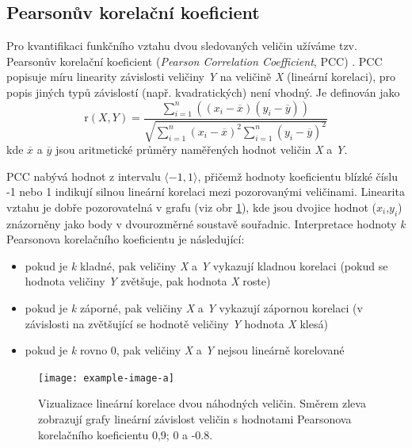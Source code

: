 \subsection{Pearsonův korelační koeficient}
Pro kvantifikaci funkčního vztahu dvou sledovaných veličin užíváme tzv. Pearsonův korelační koeficient (\textit{Pearson Correlation Coefficient}, PCC) \cite{PCC}. PCC popisuje míru linearity závislosti veličiny \textit{Y} na veličině \textit{X} (lineární korelaci), pro popis jiných typů závislostí (např. kvadratických) není vhodný. Je definován jako
\begin{equation}
\label{pearson}
    \text{r}(X,Y) = \frac
    {\sum_{i=1}^n ((x_i - \overline{x})(y_i - \overline{y}))}
    {\sqrt{\sum_{i=1}^n (x_i - \overline{x})^2 \sum_{i=1}^n (y_i - \overline{y})^2}}
\end{equation}
kde $\overline{x}$ a $\overline{y}$ jsou aritmetické průměry naměřených hodnot veličin \textit{X} a \textit{Y}. 

PCC nabývá hodnot z intervalu $\langle-1, 1 \rangle$, přičemž hodnoty koeficientu blízké číslu -1 nebo 1 indikují silnou lineární korelaci mezi pozorovanými veličinami. Linearita vztahu je dobře pozorovatelná v grafu (viz obr \ref{PCC_obr}), kde jsou dvojice hodnot ($x_i$,$y_i$) znázorněny jako body v dvourozměrné soustavě souřadnic. Interpretace hodnoty \textit{k} Pearsonova korelačního koeficientu je následující: 
\begin{itemize}
    \item pokud je \textit{k} kladné, pak veličiny \textit{X} a \textit{Y} vykazují kladnou korelaci (pokud se hodnota veličiny \textit{Y} zvětšuje, pak hodnota\textit{ X} roste)
    \item pokud je \textit{k} záporné, pak veličiny \textit{X} a \textit{Y} vykazují zápornou korelaci (v závislosti na zvětšující se hodnotě veličiny \textit{Y} hodnota \textit{X} klesá)
    \item pokud je \textit{k} rovno 0, pak veličiny \textit{X} a \textit{Y} nejsou lineárně korelované
\end{itemize}

\begin{figure}[h]
\begin{center}
\texttt{[image: example-image-a]}
\caption{Vizualizace lineární korelace dvou náhodných veličin. Směrem zleva zobrazují grafy lineární závislost veličin s hodnotami Pearsonova korelačního koeficientu 0,9; 0 a -0.8.}
\label{PCC_obr}
\end{center}
\end{figure}


